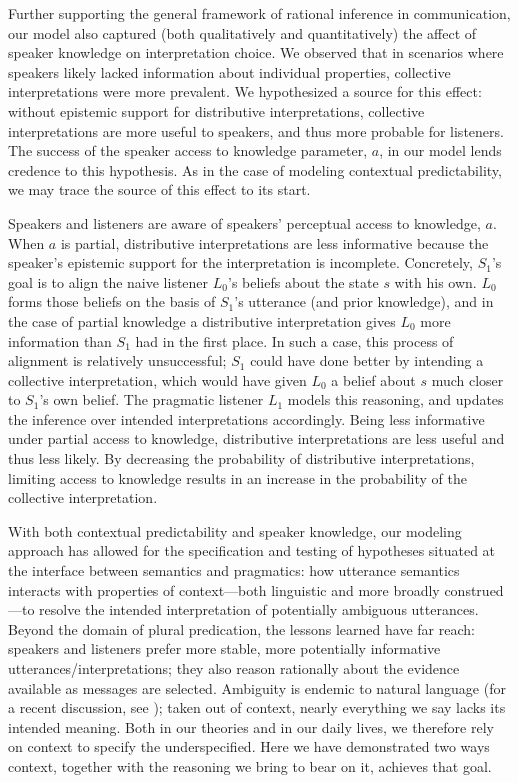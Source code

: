 \documentclass[linguex]{sp}
\begin{document}
Further supporting the general framework of rational inference in communication, our model also captured (both qualitatively and quantitatively) the affect of speaker knowledge on interpretation choice. We observed that in scenarios where speakers likely lacked information about individual properties, collective interpretations were more prevalent. We hypothesized a source for this effect: without epistemic support for distributive interpretations, collective interpretations are more useful to speakers, and thus more probable for listeners. The success of the speaker access to knowledge parameter, $a$, in our model lends credence to this hypothesis. As in the case of modeling contextual predictability, we may trace the source of this effect to its start.

Speakers and listeners are aware of speakers' perceptual access to knowledge, $a$. When $a$ is partial, distributive interpretations are less informative because the speaker's epistemic support for the interpretation is incomplete. Concretely, $S_{1}$'s goal is to align the naive listener $L_{0}$'s beliefs about the state $s$ with his own. $L_{0}$ forms those beliefs on the basis of $S_{1}$'s utterance (and prior knowledge), and in the case of partial knowledge a distributive interpretation gives $L_{0}$ more information than $S_{1}$ had in the first place. In such a case, this process of alignment is relatively unsuccessful; $S_{1}$ could have done better by intending a collective interpretation, which would have given $L_{0}$ a belief about $s$ much closer to $S_{1}$'s own belief. The pragmatic listener $L_{1}$ models this reasoning, and updates the inference over intended interpretations accordingly. Being less informative under partial access to knowledge, distributive interpretations are less useful and thus less likely. By decreasing the probability of distributive interpretations, limiting access to knowledge results in an increase in the probability of the collective interpretation.

With both contextual predictability and speaker knowledge, our modeling approach has allowed for the specification and testing of hypotheses situated at the interface between semantics and pragmatics: how utterance semantics interacts with properties of context---both linguistic and more broadly construed---to resolve the intended interpretation of potentially ambiguous utterances. Beyond the domain of plural predication, the lessons learned have far reach: speakers and listeners prefer more stable, more potentially informative utterances/interpretations; they also reason rationally about the evidence available as messages are selected. Ambiguity is endemic to natural language (for a recent discussion, see \citealp{piantadosietal2012}); taken out of context, nearly everything we say lacks its intended meaning. Both in our theories and in our daily lives, we therefore rely on context to specify the underspecified. Here we have demonstrated two ways context, together with the reasoning we bring to bear on it, achieves that goal.
\end{document}

